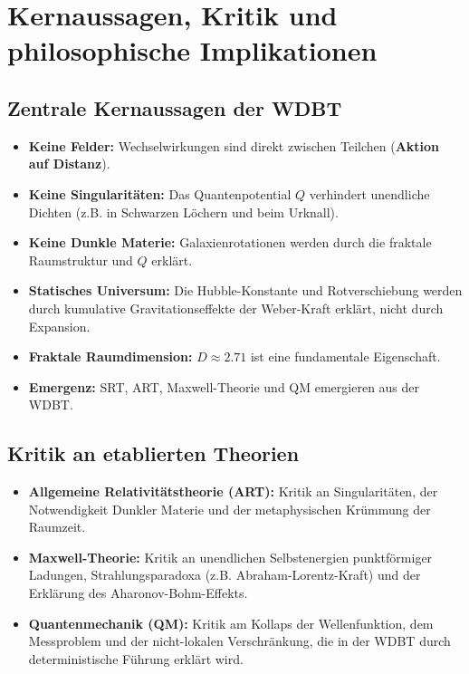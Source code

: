 \documentclass[11pt, a4paper]{article}
\begin{document}
\section{Kernaussagen, Kritik und philosophische Implikationen}
\label{sec:kern_kritik}

\subsection{Zentrale Kernaussagen der WDBT}
\label{subsec:kernaussagen}
\begin{itemize}
    \item \textbf{Keine Felder:} Wechselwirkungen sind direkt zwischen Teilchen (\textbf{Aktion auf Distanz}).
    \item \textbf{Keine Singularitäten:} Das Quantenpotential $Q$ verhindert unendliche Dichten (z.B. in Schwarzen Löchern und beim Urknall).
    \item \textbf{Keine Dunkle Materie:} Galaxienrotationen werden durch die fraktale Raumstruktur und $Q$ erklärt.
    \item \textbf{Statisches Universum:} Die Hubble-Konstante und Rotverschiebung werden durch kumulative Gravitationseffekte der Weber-Kraft erklärt, nicht durch Expansion.
    \item \textbf{Fraktale Raumdimension:} $D \approx 2.71$ ist eine fundamentale Eigenschaft.
    \item \textbf{Emergenz:} SRT, ART, Maxwell-Theorie und QM emergieren aus der WDBT.
\end{itemize}

\subsection{Kritik an etablierten Theorien}
\label{subsec:kritik}
\begin{itemize}
    \item \textbf{Allgemeine Relativitätstheorie (ART):} Kritik an Singularitäten, der Notwendigkeit Dunkler Materie und der \glqq metaphysischen\grqq{} Krümmung der Raumzeit.
    \item \textbf{Maxwell-Theorie:} Kritik an unendlichen Selbstenergien punktförmiger Ladungen, Strahlungsparadoxa (z.B. Abraham-Lorentz-Kraft) und der Erklärung des Aharonov-Bohm-Effekts.
    \item \textbf{Quantenmechanik (QM):} Kritik am Kollaps der Wellenfunktion, dem Messproblem und der nicht-lokalen Verschränkung, die in der WDBT durch deterministische Führung erklärt wird.
\end{itemize}
\end{document}
